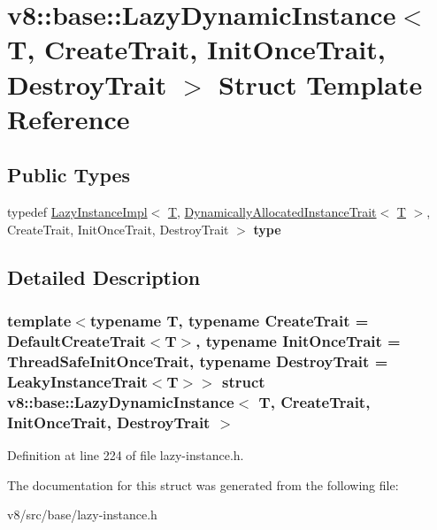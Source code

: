 \hypertarget{structv8_1_1base_1_1LazyDynamicInstance}{}\section{v8\+:\+:base\+:\+:Lazy\+Dynamic\+Instance$<$ T, Create\+Trait, Init\+Once\+Trait, Destroy\+Trait $>$ Struct Template Reference}
\label{structv8_1_1base_1_1LazyDynamicInstance}
\subsection*{Public Types}
\begin{DoxyCompactItemize}
\item 
\mbox{\label{structv8_1_1base_1_1LazyDynamicInstance_a86754cf35cdf03a9ca60d5fd16352ac1}} 
typedef \mbox{\hyperlink{structv8_1_1base_1_1LazyInstanceImpl}{Lazy\+Instance\+Impl}}$<$ \mbox{\hyperlink{classv8_1_1internal_1_1torque_1_1T}{T}}, \mbox{\hyperlink{structv8_1_1base_1_1DynamicallyAllocatedInstanceTrait}{Dynamically\+Allocated\+Instance\+Trait}}$<$ \mbox{\hyperlink{classv8_1_1internal_1_1torque_1_1T}{T}} $>$, Create\+Trait, Init\+Once\+Trait, Destroy\+Trait $>$ {\bfseries type}
\end{DoxyCompactItemize}


\subsection{Detailed Description}
\subsubsection*{template$<$typename T, typename Create\+Trait = Default\+Create\+Trait$<$\+T$>$, typename Init\+Once\+Trait = Thread\+Safe\+Init\+Once\+Trait, typename Destroy\+Trait = Leaky\+Instance\+Trait$<$\+T$>$$>$\newline
struct v8\+::base\+::\+Lazy\+Dynamic\+Instance$<$ T, Create\+Trait, Init\+Once\+Trait, Destroy\+Trait $>$}



Definition at line 224 of file lazy-\/instance.\+h.



The documentation for this struct was generated from the following file\+:\begin{DoxyCompactItemize}
\item 
v8/src/base/lazy-\/instance.\+h\end{DoxyCompactItemize}
